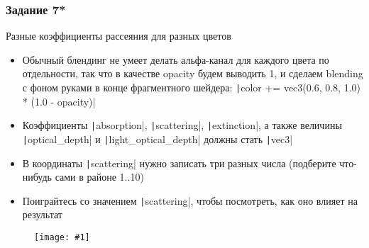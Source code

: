 \documentclass[10pt]{beamer}
\newcommand{\slideimage}[1]{
  \begin{figure}
    \begin{adjustbox}{width=\textwidth, totalheight=\textheight-2\baselineskip-2\baselineskip,keepaspectratio}
      \texttt{[image: \#1]}
    \end{adjustbox}
  \end{figure}
}
\begin{document}
\begin{frame}[fragile]
\frametitle{Задание 7*}
Разные коэффициенты рассеяния для разных цветов
\begin{itemize}
\item Обычный блендинг не умеет делать альфа-канал для каждого цвета по отдельности, так что в качестве opacity будем выводить 1, и сделаем blending с фоном руками в конце фрагментного шейдера: \texttt|color += vec3(0.6, 0.8, 1.0) * (1.0 - opacity)|
\item Коэффициенты \texttt|absorption|, \texttt|scattering|, \texttt|extinction|, а также величины \texttt|optical_depth| и \texttt|light_optical_depth| должны стать \texttt|vec3|
\item В координаты \texttt|scattering| нужно записать три разных числа (подберите что-нибудь сами в районе 1..10)
\item Поиграйтесь со значением \texttt|scattering|, чтобы посмотреть, как оно влияет на результат
\end{itemize}
\end{frame}

\begin{frame}[fragile]
\slideimage{7.png}
\end{frame}
\end{document}
